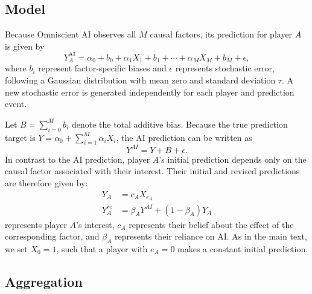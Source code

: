 \documentclass[12pt]{article}
\begin{document}
\subsection{Model}

Because Omniscient AI observes all $M$ causal factors, its prediction for player $A$ is given by
\begin{equation}
Y_A^{\mathrm{AI}} = \alpha_0 + b_0 + \alpha_1 X_1 + b_1 + \cdots + \alpha_M X_M + b_M + \epsilon,
\end{equation}
where $b_i$ represent factor-specific biases and $\epsilon$ represents stochastic error, following a Gaussian distribution with mean zero and standard deviation $\tau$.
A new stochastic error is generated independently for each player and prediction event.

Let $B=\sum_{i=0}^{M}b_i$ denote the total additive bias. 
Because the true prediction target is $Y=\alpha_0+\sum_{i=1}^{M}\alpha_iX_i$, the AI prediction can be written as
\begin{equation}
Y^{AI} = Y + B + \epsilon.
\end{equation}
In contrast to the AI prediction, player $A$'s initial prediction depends only on the causal factor associated with their interest. 
Their initial and revised predictions are therefore given by:
\begin{align}
Y_A &= c_A X_{e_A}\\
Y_A^{re} &= \beta_A Y^{AI} + (1-\beta_A)Y_A
\end{align}
represents player $A$'s interest, $c_A$ represents their belief about the effect of the corresponding factor, and $\beta_A$ represents their reliance on AI.
As in the main text, we set $X_0=1$, such that a player with $e_A=0$ makes a constant initial prediction.

\subsection{Aggregation}
\end{document}
